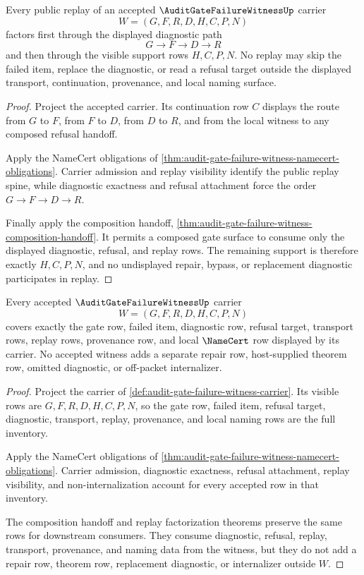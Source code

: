 \begin{theorem}
\label{thm:audit-gate-failure-witness-replay-factorization}
Every public replay of an accepted $\AuditGateFailureWitnessUp$ carrier
$$
W=(G,F,R,D,H,C,P,N)
$$
factors first through the displayed diagnostic path
$$
G \to F \to D \to R
$$
and then through the visible support rows $H,C,P,N$. No replay may skip the
failed item, replace the diagnostic, or read a refusal target outside the
displayed transport, continuation, provenance, and local naming surface.
\end{theorem}
\begin{proof}
Project the accepted carrier. Its continuation row $C$ displays the route from
$G$ to $F$, from $F$ to $D$, from $D$ to $R$, and from the local witness to any
composed refusal handoff.

Apply the NameCert obligations of
\autoref{thm:audit-gate-failure-witness-namecert-obligations}. Carrier
admission and replay visibility identify the public replay spine, while
diagnostic exactness and refusal attachment force the order
$G \to F \to D \to R$.

Finally apply the composition handoff,
\autoref{thm:audit-gate-failure-witness-composition-handoff}. It permits a
composed gate surface to consume only the displayed diagnostic, refusal, and
replay rows. The remaining support is therefore exactly $H,C,P,N$, and no
undisplayed repair, bypass, or replacement diagnostic participates in replay.
\end{proof}

\begin{theorem}
\label{thm:audit-gate-failure-witness-boundary-coverage}
Every accepted $\AuditGateFailureWitnessUp$ carrier
$$
W=(G,F,R,D,H,C,P,N)
$$
covers exactly the gate row, failed item, diagnostic row, refusal target, transport rows, replay rows, provenance row, and local $\NameCert$ row displayed by its carrier. No accepted witness adds a separate repair row, host-supplied theorem row, omitted diagnostic, or off-packet internalizer.
\end{theorem}
\begin{proof}
Project the carrier of \autoref{def:audit-gate-failure-witness-carrier}. Its visible rows are $G,F,R,D,H,C,P,N$, so the gate row, failed item, refusal target, diagnostic, transport, replay, provenance, and local naming rows are the full inventory.

Apply the NameCert obligations of \autoref{thm:audit-gate-failure-witness-namecert-obligations}. Carrier admission, diagnostic exactness, refusal attachment, replay visibility, and non-internalization account for every accepted row in that inventory.

The composition handoff and replay factorization theorems preserve the same rows for downstream consumers. They consume diagnostic, refusal, replay, transport, provenance, and naming data from the witness, but they do not add a repair row, theorem row, replacement diagnostic, or internalizer outside $W$.
\end{proof}

